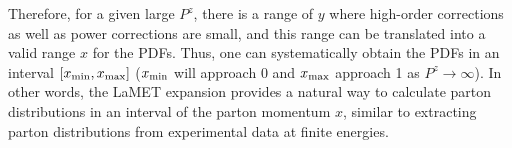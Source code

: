 Therefore, for a given large $P^z$,
there is a range of $y$ where high-order corrections as well as power corrections are small, and this range can be translated into
a valid range $x$ for the PDFs. Thus, one can systematically obtain the PDFs in an interval $[x_{\rm min}, x_{\rm max}]$ ($x_{\rm min}$ will approach 0 and $x_{\rm max}$ approach 1 as $P^z\to \infty$).
In other words, the LaMET
expansion provides a natural way to calculate parton distributions
in an interval of the parton momentum $x$, similar to extracting parton distributions from
experimental data at finite energies.
